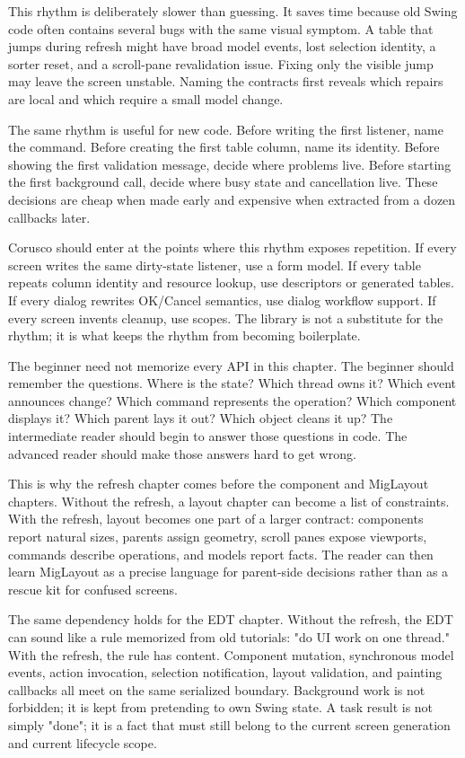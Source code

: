 This rhythm is deliberately slower than guessing. It saves time because old Swing code often contains several bugs with the same visual symptom. A table that jumps during refresh might have broad model events, lost selection identity, a sorter reset, and a scroll-pane revalidation issue. Fixing only the visible jump may leave the screen unstable. Naming the contracts first reveals which repairs are local and which require a small model change.

The same rhythm is useful for new code. Before writing the first listener, name the command. Before creating the first table column, name its identity. Before showing the first validation message, decide where problems live. Before starting the first background call, decide where busy state and cancellation live. These decisions are cheap when made early and expensive when extracted from a dozen callbacks later.

Corusco should enter at the points where this rhythm exposes repetition. If every screen writes the same dirty-state listener, use a form model. If every table repeats column identity and resource lookup, use descriptors or generated tables. If every dialog rewrites OK/Cancel semantics, use dialog workflow support. If every screen invents cleanup, use scopes. The library is not a substitute for the rhythm; it is what keeps the rhythm from becoming boilerplate.

The beginner need not memorize every API in this chapter. The beginner should remember the questions. Where is the state? Which thread owns it? Which event announces change? Which command represents the operation? Which component displays it? Which parent lays it out? Which object cleans it up? The intermediate reader should begin to answer those questions in code. The advanced reader should make those answers hard to get wrong.

This is why the refresh chapter comes before the component and MigLayout chapters. Without the refresh, a layout chapter can become a list of constraints. With the refresh, layout becomes one part of a larger contract: components report natural sizes, parents assign geometry, scroll panes expose viewports, commands describe operations, and models report facts. The reader can then learn MigLayout as a precise language for parent-side decisions rather than as a rescue kit for confused screens.

The same dependency holds for the EDT chapter. Without the refresh, the EDT can
sound like a rule memorized from old tutorials: "do UI work on one thread." With
the refresh, the rule has content. Component mutation, synchronous model
events, action invocation, selection notification, layout validation, and
painting callbacks all meet on the same serialized boundary. Background work is
not forbidden; it is kept from pretending to own Swing state. A task result is
not simply "done"; it is a fact that must still belong to the current screen
generation and current lifecycle scope.

